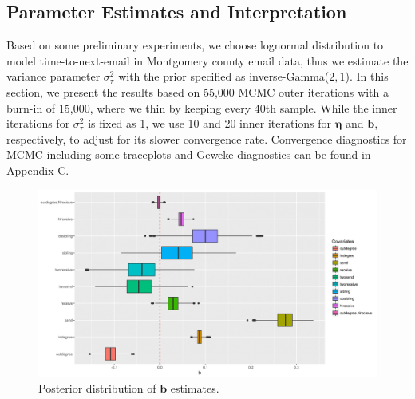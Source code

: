 \documentclass[ba]{imsart}
\numberwithin{equation}{section}
\theoremstyle{plain}
\begin{document}
	\subsection{Parameter Estimates and Interpretation}\label{subsec:Result_email}
	Based on some preliminary experiments, we choose lognormal distribution to model time-to-next-email in Montgomery county email data, thus we estimate the variance parameter $\sigma_\tau^2$ with the prior specified as inverse-Gamma($2, 1$). In this section, we present the results based on 55,000 MCMC outer iterations with a burn-in of 15,000, where we thin by keeping every 40th sample. While the inner iterations for  $\sigma_\tau^2$ is fixed as 1, we use 10 and 20 inner iterations for $\boldsymbol{\eta}$ and $\boldsymbol{b}$, respectively, to adjust for its slower convergence rate. Convergence diagnostics for MCMC including some traceplots and Geweke diagnostics \citep{geweke1991evaluating} can be found in Appendix C.
	\begin{figure}[!t]
		\centering
		\includegraphics[width=1\textwidth]{img/best-1.png}	
		\caption {Posterior distribution of $\boldsymbol{b}$ estimates.}
		\label{figure:betaresults}
	\end{figure}
	
\end{document}
